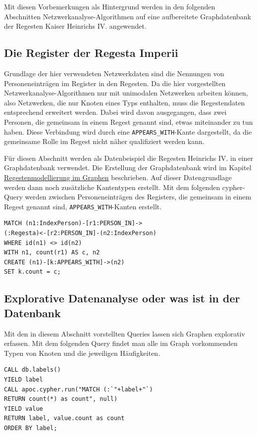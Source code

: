 \documentclass[12pt,ngerman,]{article}
\begin{document}
Mit diesen Vorbemerkungen als Hintergrund werden in den folgenden
Abschnitten Netzwerkanalyse-Algorithmen auf eine aufbereitete
Graphdatenbank der Regesten Kaiser Heinrichs IV. angewendet.

\subsection{Die Register der Regesta
Imperii}\label{die-register-der-regesta-imperii}

Grundlage der hier verwendeten Netzwerkdaten sind die Nennungen von
Personeneinträgen im Register in den Regesten. Da die hier vorgestellten
Netzwerkanalyse-Algorithmen nur mit unimodalen Netzwerken arbeiten
können, also Netzwerken, die nur Knoten eines Typs enthalten, muss die
Regestendaten entsprechend erweitert werden. Dabei wird davon
ausgegangen, dass zwei Personen, die gemeinsam in einem Regest genannt
sind, etwas miteinander zu tun haben. Diese Verbindung wird durch eine
\texttt{APPEARS\_WITH}-Kante dargestellt, da die gemeinsame Rolle im
Regest nicht näher qualifiziert werden kann.

Für diesen Abschnitt werden als Datenbeispiel die Regesten Heinrichs IV.
in einer Graphdatenbank verwendet. Die Erstellung der Graphdatenbank
wird im Kapitel
\href{20_Regestenmodellierung-im-Graphen.md}{Regestenmodellierung im
Graphen} beschrieben. Auf dieser Datengrundlage werden dann noch
zusätzliche Kantentypen erstellt. Mit dem folgenden cypher-Query werden
zwischen Personeneinträgen des Registers, die gemeinsam in einem Regest
genannt sind, \texttt{APPEARS\_WITH}-Kanten erstellt.

\begin{verbatim}
MATCH (n1:IndexPerson)-[r1:PERSON_IN]->
(:Regesta)<-[r2:PERSON_IN]-(n2:IndexPerson)
WHERE id(n1) <> id(n2)
WITH n1, count(r1) AS c, n2
CREATE (n1)-[k:APPEARS_WITH]->(n2)
SET k.count = c;
\end{verbatim}

\subsection{Explorative Datenanalyse oder was ist in der
Datenbank}\label{explorative-datenanalyse-oder-was-ist-in-der-datenbank}

Mit den in diesem Abschnitt vorstellten Queries lassen sich Graphen
explorativ erfassen. Mit dem folgenden Query findet man alle im Graph
vorkommenden Typen von Knoten und die jeweiligen Häufigkeiten.

\begin{verbatim}
CALL db.labels()
YIELD label
CALL apoc.cypher.run("MATCH (:`"+label+"`)
RETURN count(*) as count", null)
YIELD value
RETURN label, value.count as count
ORDER BY label;
\end{verbatim}
\end{document}
